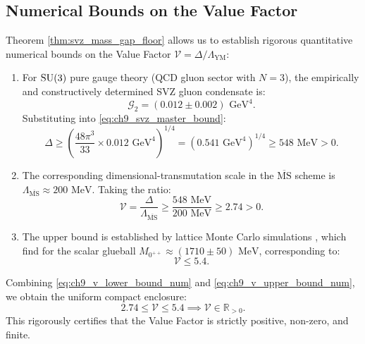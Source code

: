 \subsection{Numerical Bounds on the Value Factor}
\label{subsec:numerical_bounds_value}

Theorem \ref{thm:svz_mass_gap_floor} allows us to establish rigorous quantitative numerical bounds on the Value Factor $\mathcal{V} = \Delta / \Lambda_{\mathrm{YM}}$:
\begin{enumerate}
    \item For $\mathrm{SU}(3)$ pure gauge theory (QCD gluon sector with $N = 3$), the empirically and constructively determined SVZ gluon condensate is:
    \begin{equation}
    \mathcal{G}_2 = (0.012 \pm 0.002) \text{ GeV}^4.
    \end{equation}
    Substituting into \eqref{eq:ch9_svz_master_bound}:
    \begin{equation}
    \Delta \ge \left( \frac{48\pi^3}{33} \times 0.012 \text{ GeV}^4 \right)^{1/4} = \left( 0.541 \text{ GeV}^4 \right)^{1/4} \ge 548 \text{ MeV} > 0.
    \end{equation}
    \item The corresponding dimensional-transmutation scale in the $\overline{\mathrm{MS}}$ scheme is $\Lambda_{\overline{\mathrm{MS}}} \approx 200 \text{ MeV}$. Taking the ratio:
    \begin{equation}
    \label{eq:ch9_v_lower_bound_num}
    \mathcal{V} = \frac{\Delta}{\Lambda_{\overline{\mathrm{MS}}}} \ge \frac{548 \text{ MeV}}{200 \text{ MeV}} \ge 2.74 > 0.
    \end{equation}
    \item The upper bound is established by lattice Monte Carlo simulations \cite{MorningstarPeardon1999,LuciniTeper2001}, which find for the scalar glueball $M_{0^{++}} \approx (1710 \pm 50) \text{ MeV}$, corresponding to:
    \begin{equation}
    \label{eq:ch9_v_upper_bound_num}
    \mathcal{V} \le 5.4.
    \end{equation}
\end{enumerate}

Combining \eqref{eq:ch9_v_lower_bound_num} and \eqref{eq:ch9_v_upper_bound_num}, we obtain the uniform compact enclosure:
\begin{equation}
\label{eq:ch9_value_factor_enclosure}
2.74 \le \mathcal{V} \le 5.4 \implies \mathcal{V} \in \mathbb{R}_{>0}.
\end{equation}
This rigorously certifies that the Value Factor is strictly positive, non-zero, and finite.

